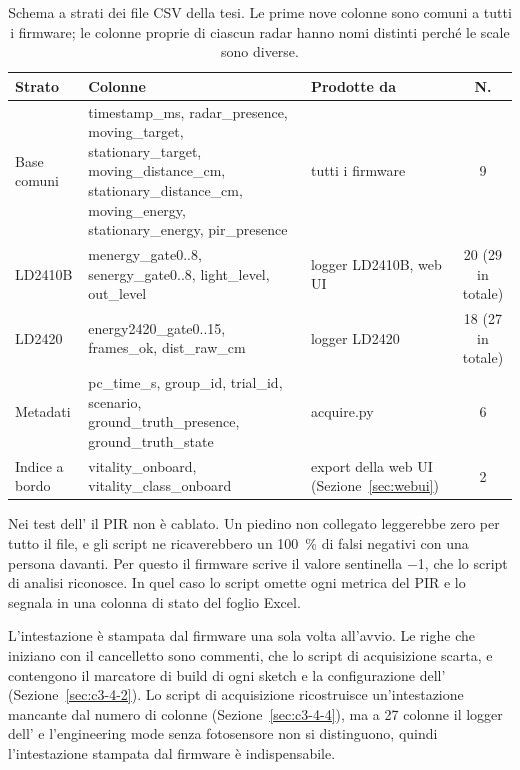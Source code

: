 \begin{table}[!htb]
\centering
\caption{Schema a strati dei file CSV della tesi. Le prime nove colonne sono comuni a tutti i firmware; le colonne proprie di ciascun radar hanno nomi distinti perché le scale sono diverse.}
\label{tab:c3-15}
\small
\begin{tabularx}{\linewidth}{@{}>{\raggedright\arraybackslash}p{2.1cm}>{\raggedright\arraybackslash}X>{\raggedright\arraybackslash}p{2.4cm}c@{}}
\toprule
\textbf{Strato} & \textbf{Colonne} & \textbf{Prodotte da} & \textbf{N.} \\
\midrule
Base comuni & timestamp\_\allowbreak{}ms, radar\_\allowbreak{}presence, moving\_\allowbreak{}target, stationary\_\allowbreak{}target, moving\_\allowbreak{}distance\_\allowbreak{}cm, stationary\_\allowbreak{}distance\_\allowbreak{}cm, moving\_\allowbreak{}energy, stationary\_\allowbreak{}energy, pir\_\allowbreak{}presence & tutti i firmware & 9 \\
LD2410B & menergy\_\allowbreak{}gate0..8, senergy\_\allowbreak{}gate0..8, light\_\allowbreak{}level, out\_\allowbreak{}level & logger LD2410B, web UI & 20 (29 in totale) \\
LD2420 & energy2420\_\allowbreak{}gate0..15, frames\_\allowbreak{}ok, dist\_\allowbreak{}raw\_\allowbreak{}cm & logger LD2420 & 18 (27 in totale) \\
Metadati & pc\_\allowbreak{}time\_\allowbreak{}s, group\_\allowbreak{}id, trial\_\allowbreak{}id, scenario, ground\_\allowbreak{}truth\_\allowbreak{}presence, ground\_\allowbreak{}truth\_\allowbreak{}state & acquire.py & 6 \\
Indice a bordo & vitality\_\allowbreak{}onboard, vitality\_\allowbreak{}class\_\allowbreak{}onboard & export della web UI (Sezione~\ref{sec:webui}) & 2 \\
\bottomrule
\end{tabularx}
\end{table}

Nei test dell'\ldc{} il PIR non è cablato. Un piedino non collegato leggerebbe zero per tutto il file, e gli script ne ricaverebbero un 100~\% di falsi negativi con una persona davanti. Per questo il firmware scrive il valore sentinella \(-\)1, che lo script di analisi riconosce. In quel caso lo script omette ogni metrica del PIR e lo segnala in una colonna di stato del foglio Excel.

L'intestazione è stampata dal firmware una sola volta all'avvio. Le righe che iniziano con il cancelletto sono commenti, che lo script di acquisizione scarta, e contengono il marcatore di build di ogni sketch e la configurazione dell'\ldc{} (Sezione~\ref{sec:c3-4-2}). Lo script di acquisizione ricostruisce un'intestazione mancante dal numero di colonne (Sezione~\ref{sec:c3-4-4}), ma a 27 colonne il logger dell'\ldc{} e l'engineering mode senza fotosensore non si distinguono, quindi l'intestazione stampata dal firmware è indispensabile.

